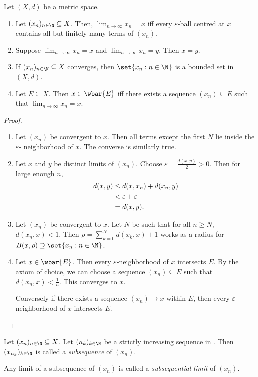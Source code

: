 \begin{theorem}
    Let $(X, d)$ be a metric space.
    \begin{enumerate}
        \item Let $(x_n)_{n \in \N} \subseteq X$.
        Then, $\lim_{n \to \infty} x_n = x$ iff every $\varepsilon$-ball
        centred at $x$ contains all but finitely many terms of $(x_n)$.
        \item Suppose $\lim_{n \to \infty} x_n = x$ and
        $\lim_{n \to \infty} x_n = y$. Then $x = y$.
        \item If $(x_n)_{n \in \N} \subseteq X$ converges, then
        $\set{x_n : n \in \N}$ is a bounded set in $(X, d)$.
        \item Let $E \subseteq X$.
        Then $x \in \wbar{E}$ iff there exists a sequence $(x_n)\subseteq E$
        such that $\lim_{n \to \infty} x_n = x$.
    \end{enumerate}
\end{theorem}
\begin{proof} \leavevmode
    \begin{enumerate}
        \item Let $(x_n)$ be convergent to $x$.
        Then all terms except the first $N$ lie inside the $\varepsilon$-
        neighborhood of $x$.
        The converse is similarly true.
        \item Let $x$ and $y$ be distinct limits of $(x_n)$.
        Choose $\varepsilon = \frac{d(x, y)}{2} > 0$.
        Then for large enough $n$, \begin{align*}
            d(x, y) &\le d(x, x_n) + d(x_n, y) \\
            &< \varepsilon + \varepsilon \\
            &= d(x, y). \qedhere
        \end{align*}
        \item Let $(x_n)$ be convergent to $x$.
        Let $N$ be such that for all $n \ge N$, $d(x_n, x) < 1$.
        Then $\rho = \sum_{k=0}^{N} d(x_k, x) + 1$ works as a radius for
        $B(x, \rho) \supseteq \set{x_n : n \in \N}$.
        \item Let $x \in \wbar{E}$.
        Then every $\varepsilon$-neighborhood of $x$ intersects $E$.
        By the axiom of choice, we can choose a sequence $(x_n) \subseteq E$
        such that $d(x_n, x) < \frac1n$.
        This converges to $x$.

        Conversely if there exists a sequence $(x_n) \to x$ within $E$, then
        every $\varepsilon$-neighborhood of $x$ intersects $E$.
    \end{enumerate}
\end{proof}

\begin{definition}
    Let $(x_n)_{n \in \N} \subseteq X$.
    Let $(n_k)_{k \in \N}$ be a strictly increasing sequence in \N.
    Then $(x_{n_k})_{k \in \N}$ is called a \emph{subsequence} of $(x_n)$.

    Any limit of a subsequence of $(x_n)$ is called a \emph{subsequential
    limit} of $(x_n)$.
\end{definition}
